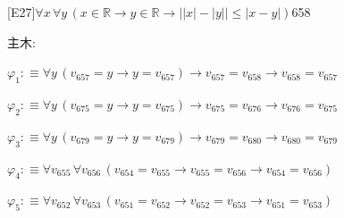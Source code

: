 \begin{fullproof}{[E27]}{$\forall x\,\forall y\,(x \in \mathbb{R} \to y \in \mathbb{R} \to \lvert \lvert x \rvert - \lvert y \rvert \rvert \leq \lvert x - y \rvert)$}{658}
\begin{ptree}
\noLine
{}
\noLine
{}
\noLine
{}
\end{ptree}
\noindent 主木:
\begin{ptree}
\noLine
{}
\noLine
{}
\noLine
{}
\noLine
{}
\noLine
{}
\end{ptree}
\begin{abbrevlist}
\item $\varphi_{1} :\equiv \forall y\,(v_{657} = y \to y = v_{657}) \to v_{657} = v_{658} \to v_{658} = v_{657}$
\item $\varphi_{2} :\equiv \forall y\,(v_{675} = y \to y = v_{675}) \to v_{675} = v_{676} \to v_{676} = v_{675}$
\item $\varphi_{3} :\equiv \forall y\,(v_{679} = y \to y = v_{679}) \to v_{679} = v_{680} \to v_{680} = v_{679}$
\item $\varphi_{4} :\equiv \forall v_{655}\,\forall v_{656}\,(v_{654} = v_{655} \to v_{655} = v_{656} \to v_{654} = v_{656})$
\item $\varphi_{5} :\equiv \forall v_{652}\,\forall v_{653}\,(v_{651} = v_{652} \to v_{652} = v_{653} \to v_{651} = v_{653})$

\end{abbrevlist}
\end{fullproof}
